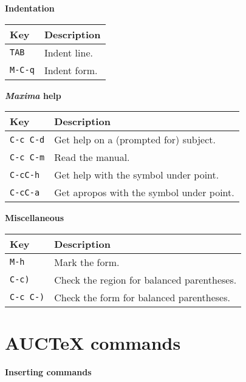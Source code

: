 \documentclass{article}
\newcommand{\mx}{\textsl{\sffamily Maxima}}
\begin{document}
\smallskip

\noindent
\textbf{Indentation}

\smallskip

\noindent
\begin{tabular}{p{\firstcol}p{\secondcol}}
\hline
\textbf{Key} & \textbf{Description}\\
\hline
\texttt{TAB} & Indent line.\\
\texttt{M-C-q} & Indent form.
\end{tabular}


\smallskip

\noindent
\textbf{\mx{} help}

\smallskip

\noindent
\begin{tabular}{p{\firstcol}p{\secondcol}}
\hline
\textbf{Key} & \textbf{Description}\\
\hline
\texttt{C-c C-d}
& Get help on a (prompted for) subject.\\
\texttt{C-c C-m}
& Read the manual.\\
\texttt{C-cC-h} & Get help with the symbol under point.\\
\texttt{C-cC-a} & Get apropos with the symbol under point.
\end{tabular}

\smallskip

\noindent
\textbf{Miscellaneous}

\smallskip

\noindent
\begin{tabular}{p{\firstcol}p{\secondcol}}
\hline
\textbf{Key} & \textbf{Description}\\
\hline
\texttt{M-h} & Mark the form.\\
\texttt{C-c)} & Check the region for balanced parentheses.\\
\texttt{C-c C-)} & Check the form for balanced parentheses.
\end{tabular}

\section{AUC\TeX{} commands}

\smallskip

\noindent
\textbf{Inserting commands}

\smallskip
\end{document}
